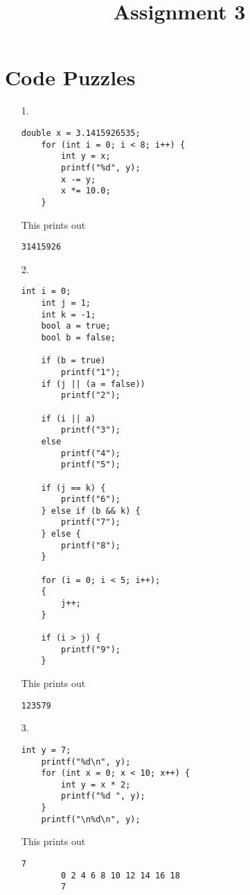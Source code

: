 \documentclass{article}
\begin{document}
\title{Assignment 3}
\maketitle
\thispagestyle{fancy}

\section*{Code Puzzles}
\begin{itemize}
	\item[1.]
	\begin{lstlisting}[style=nonumbers]
	double x = 3.1415926535;
	for (int i = 0; i < 8; i++) {
		int y = x;
		printf("%d", y);
		x -= y;
		x *= 10.0;
	}
	\end{lstlisting}
	\begin{answer*}
		This prints out 
		\begin{lstlisting}[style=nonumbers]
		31415926
		\end{lstlisting}
	\end{answer*}
		
	\item[2.]
	\begin{lstlisting}[style=nonumbers]
	int i = 0;
	int j = 1;
	int k = -1;
	bool a = true;
	bool b = false;

	if (b = true)
		printf("1");
	if (j || (a = false))
		printf("2");

	if (i || a)
		printf("3");
	else
		printf("4");
		printf("5");

	if (j == k) {
		printf("6");
	} else if (b && k) {
		printf("7");
	} else {
		printf("8");
	}

	for (i = 0; i < 5; i++);
	{
		j++;
	}

	if (i > j) {
		printf("9");
	}
	\end{lstlisting}
	\begin{answer*}
		This prints out
		\begin{lstlisting}[style=nonumbers]
		123579
		\end{lstlisting}
	\end{answer*}
	
	\item[3.]
	\begin{lstlisting}[style=nonumbers]
	int y = 7;
	printf("%d\n", y);
	for (int x = 0; x < 10; x++) {
		int y = x * 2;
		printf("%d ", y);
	}
	printf("\n%d\n", y);
	\end{lstlisting}
	\begin{answer*}
		This prints out
		\begin{lstlisting}[style=nonumbers]
		7
		0 2 4 6 8 10 12 14 16 18
		7
		\end{lstlisting}
	\end{answer*}
		

\end{itemize}
\end{document}
